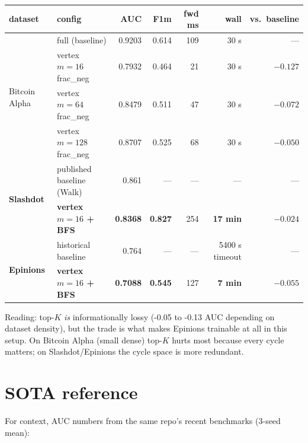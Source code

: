 \documentclass[11pt,a4paper]{article}
\begin{document}
\begin{center}
\begin{tabular}{llrrrrr}
\toprule
dataset      & config                          & AUC   & F1m   & fwd ms & wall  & vs.\ baseline \\
\midrule
\multirow{4}{*}{Bitcoin Alpha}
             & full (baseline)                 & 0.9203 & 0.614 & 109   & 30 s  & ---           \\
             & vertex $m{=}16$ frac\_neg       & 0.7932 & 0.464 & 21    & 30 s  & $-0.127$      \\
             & vertex $m{=}64$ frac\_neg       & 0.8479 & 0.511 & 47    & 30 s  & $-0.072$      \\
             & vertex $m{=}128$ frac\_neg      & 0.8707 & 0.525 & 68    & 30 s  & $-0.050$      \\
\midrule
\multirow{2}{*}{\textbf{Slashdot}}
             & published baseline (Walk)       & 0.861  & ---   & ---   & ---   & ---           \\
             & \textbf{vertex $m{=}16$ + BFS}  & \textbf{0.8368} & \textbf{0.827} & 254 & \textbf{17 min} & $-0.024$ \\
\midrule
\multirow{2}{*}{\textbf{Epinions}}
             & historical baseline             & 0.764  & ---   & ---   & 5400 s timeout & --- \\
             & \textbf{vertex $m{=}16$ + BFS}  & \textbf{0.7088} & \textbf{0.545} & 127 & \textbf{7 min} & $-0.055$ \\
\bottomrule
\end{tabular}
\end{center}

Reading: top-$K$ \emph{is} informationally lossy (-0.05 to -0.13 AUC
depending on dataset density), but the trade is what makes Epinions
trainable at all in this setup. On Bitcoin Alpha (small dense)
top-$K$ hurts most because every cycle matters; on Slashdot/Epinions
the cycle space is more redundant.

\section{SOTA reference}

For context, AUC numbers from the same repo's recent benchmarks
(3-seed mean):
\end{document}
